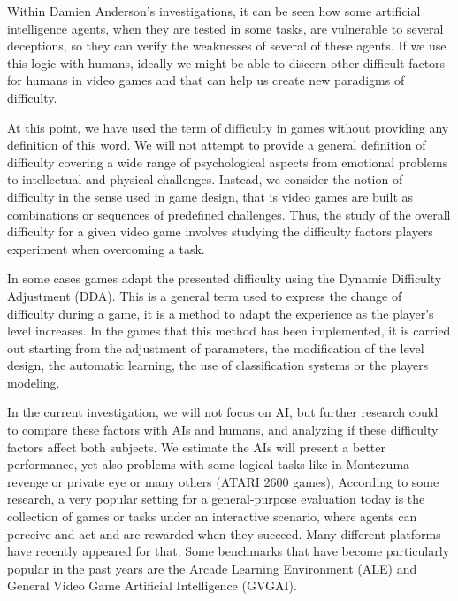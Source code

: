 Within Damien Anderson's investigations, it can be seen how some artificial intelligence agents, when they are tested in some tasks, are vulnerable to several deceptions, so they can verify the weaknesses of several of these agents. If we use this logic with humans, ideally we might be able to discern other difficult factors for humans in video games and that can help us create new paradigms of difficulty. \cite{Anderson2018Deceptive}

At this point, we have used the term of difficulty in games without providing any definition of this word. We will not attempt to provide a general definition of difficulty covering a wide range of psychological aspects from emotional problems to intellectual and physical challenges. Instead, we consider the notion of difficulty in the sense used in game design, that is video games are built as combinations or sequences of predefined challenges. Thus, the study of the overall difficulty for a given video game involves studying the difficulty factors players experiment when overcoming a task. \cite{Aponte2011DifVideoGames}

In some cases games adapt the presented difficulty using the Dynamic Difficulty Adjustment (DDA). This is a general term used to express the change of difficulty during a game, it is a method to adapt the experience as the player's level increases. In the games that this method has been implemented, it is carried out starting from the adjustment of parameters, the modification of the level design, the automatic learning, the use of classification systems or the players modeling. \cite{Sarkar2019TransDif}

In the current investigation, we will not focus on AI, but further research could to compare these factors with AIs and humans, and analyzing if these difficulty factors affect both subjects. We estimate the AIs will present a better performance, yet also problems with some logical tasks like in Montezuma revenge or private eye or many others (ATARI 2600 games), According to some research, a very popular setting for a general-purpose evaluation today is the collection of games or tasks under an interactive scenario, where agents can perceive and act and are rewarded when they succeed. Many different platforms have recently appeared for that. Some benchmarks that have become particularly popular in the past years are the Arcade Learning Environment (ALE) and General Video Game Artificial Intelligence (GVGAI). \cite{Bontrager2019Superstition, Anderson2018Deceptive, Plumed2018DualIn}


\newpage